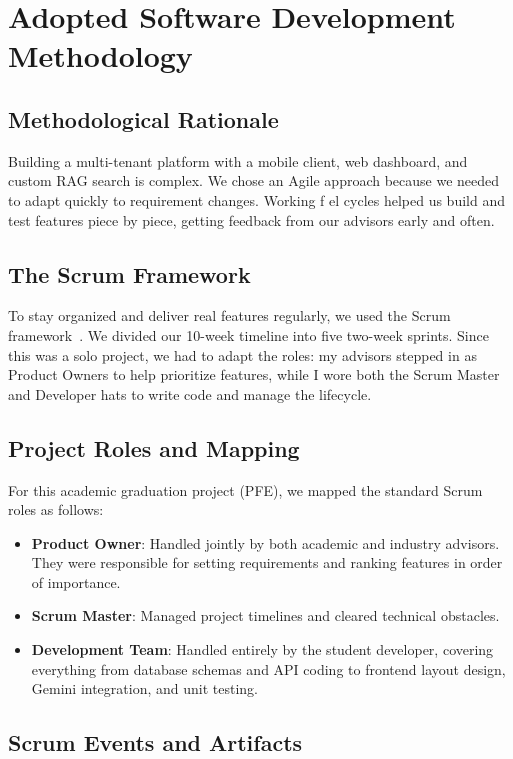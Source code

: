 \documentclass[12pt,a4paper]{report}
\begin{document}
\section{Adopted Software Development Methodology}

\subsection{Methodological Rationale}

Building a multi-tenant platform with a mobile client, web dashboard, and custom RAG search is complex. We chose an Agile approach because we needed to adapt quickly to requirement changes. Working f el cycles helped us build and test features piece by piece, getting feedback from our advisors early and often.

\subsection{The Scrum Framework}

To stay organized and deliver real features regularly, we used the Scrum framework~\cite{scrumguide}. We divided our 10-week timeline into five two-week sprints. Since this was a solo project, we had to adapt the roles: my advisors stepped in as Product Owners to help prioritize features, while I wore both the Scrum Master and Developer hats to write code and manage the lifecycle.

\subsection{Project Roles and Mapping}

For this academic graduation project (PFE), we mapped the standard Scrum roles as follows:
\begin{itemize}
    \item \textbf{Product Owner}: Handled jointly by both academic and industry advisors. They were responsible for setting requirements and ranking features in order of importance.
    \item \textbf{Scrum Master}: Managed project timelines and cleared technical obstacles.
    \item \textbf{Development Team}: Handled entirely by the student developer, covering everything from database schemas and API coding to frontend layout design, Gemini integration, and unit testing.
\end{itemize}

\subsection{Scrum Events and Artifacts}
\end{document}
